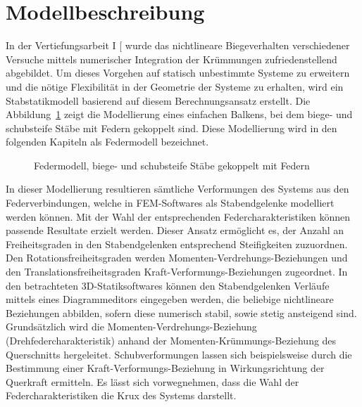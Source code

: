 \documentclass[
  11pt,
  letterpaper,
]{scrreprt}
\begin{document}
\section{Modellbeschreibung}\label{sec-modellvorstellung}

In der Vertiefungsarbeit I {[}\citeproc{ref-gitz_ansatze_2024}{1}{]}
wurde das nichtlineare Biegeverhalten verschiedener Versuche mittels
numerischer Integration der Krümmungen zufriedenstellend abgebildet. Um
dieses Vorgehen auf statisch unbestimmte Systeme zu erweitern und die
nötige Flexibilität in der Geometrie der Systeme zu erhalten, wird ein
Stabstatikmodell basierend auf diesem Berechnungsansatz erstellt. Die
Abbildung~\ref{fig-modell_drehfeder} zeigt die Modellierung eines
einfachen Balkens, bei dem biege- und schubsteife Stäbe mit Federn
gekoppelt sind. Diese Modellierung wird in den folgenden Kapiteln als
Federmodell bezeichnet.

\begin{figure}[H]


\caption{\label{fig-modell_drehfeder}Federmodell, biege- und schubsteife
Stäbe gekoppelt mit Federn}

\end{figure}%

In dieser Modellierung resultieren sämtliche Verformungen des Systems
aus den Federverbindungen, welche in FEM-Softwares als Stabendgelenke
modelliert werden können. Mit der Wahl der entsprechenden
Federcharakteristiken können passende Resultate erzielt werden. Dieser
Ansatz ermöglicht es, der Anzahl an Freiheitsgraden in den
Stabendgelenken entsprechend Steifigkeiten zuzuordnen. Den
Rotationsfreiheitsgraden werden Momenten-Verdrehungs-Beziehungen und den
Translationsfreiheitsgraden Kraft-Verformungs-Beziehungen zugeordnet. In
den betrachteten 3D-Statiksoftwares können den Stabendgelenken Verläufe
mittels eines Diagrammeditors eingegeben werden, die beliebige
nichtlineare Beziehungen abbilden, sofern diese numerisch stabil, sowie
stetig ansteigend sind. Grundsätzlich wird die
Momenten-Verdrehungs-Beziehung (Drehfedercharakteristik) anhand der
Momenten-Krümmungs-Beziehung des Querschnitts hergeleitet.
Schubverformungen lassen sich beispielsweise durch die Bestimmung einer
Kraft-Verformungs-Beziehung in Wirkungsrichtung der Querkraft ermitteln.
Es lässt sich vorwegnehmen, dass die Wahl der Federcharakteristiken die
Krux des Systems darstellt.
\end{document}
